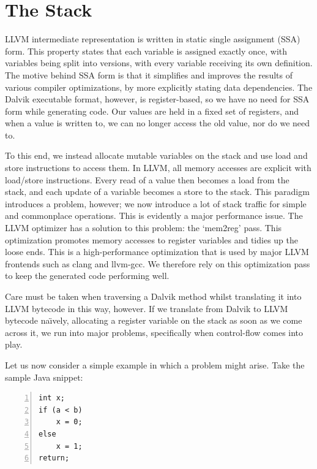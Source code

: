\section{The Stack}
\label{sec:stack}

LLVM intermediate representation is written in static single assignment (SSA) form. This property states that each variable is assigned exactly once, with variables being split into versions, with every variable receiving its own definition. The motive behind SSA form is that it simplifies and improves the results of various compiler optimizations, by more explicitly stating data dependencies. The Dalvik executable format, however, is register-based, so we have no need for SSA form while generating code. Our values are held in a fixed set of registers, and when a value is written to, we can no longer access the old value, nor do we need to.

To this end, we instead allocate mutable variables on the stack and use load and store instructions to access them. In LLVM, all memory accesses are explicit with load/store instructions. Every read of a value then becomes a load from the stack, and each update of a variable becomes a store to the stack. This paradigm introduces a problem, however; we now introduce a lot of stack traffic for simple and commonplace operations. This is evidently a major performance issue. The LLVM optimizer has a solution to this problem: the `mem2reg' pass. This optimization promotes memory accesses to register variables and tidies up the loose ends. This is a high-performance optimization that is used by major LLVM frontends such as clang and llvm-gcc\footnotemark {}. We therefore rely on this optimization pass to keep the generated code performing well.

Care must be taken when traversing a Dalvik method whilst translating it into LLVM bytecode in this way, however. If we translate from Dalvik to LLVM bytecode na\"{\i}vely, allocating a register variable on the stack as soon as we come across it, we run into major problems, specifically when control-flow comes into play.

Let us now consider a simple example in which a problem might arise. Take the sample Java snippet:

\lstset{
	language=Java,
	basicstyle=\small,
	stringstyle=\ttfamily
}

\begin{lstlisting}[frame=single, numbers=left, numberstyle=\tiny, caption={Java code}, label=lst:java_br]
int x;
if (a < b)
    x = 0;
else
    x = 1;
return;
\end{lstlisting}

